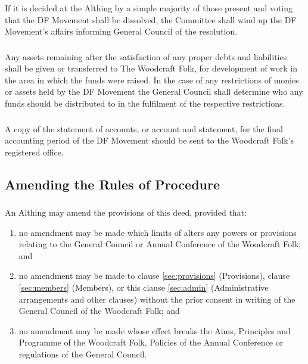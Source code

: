 \documentclass[a4paper, 12pt]{report}
\begin{document}
\subsubsection{}
If it is decided at the Althing by a simple majority of those present and voting that the DF Movement shall be dissolved, the Committee shall wind up the DF Movement's affairs informing General Council of the resolution.
\subsubsection{}
Any assets remaining after the satisfaction of any proper debts and liabilities shall be given or transferred to The Woodcraft Folk, for development of work in the area in which the funds were raised. In the case of any restrictions of monies or assets held by the DF Movement the General Council shall determine who any funds should be distributed to in the fulfilment of the respective restrictions.
\subsubsection{}
A copy of the statement of accounts, or account and statement, for the final accounting period of the DF Movement should be sent to the Woodcraft Folk's registered office.

\subsection{Amending the Rules of Procedure}
\subsubsection{}
An Althing may amend the provisions of this deed, provided that:
\begin{enumerate}[\hspace{0.5cm}(a)]
\item no amendment may be made which limits of alters any powers or provisions relating to the General Council or Annual Conference of the Woodcraft Folk; and
\item no amendment may be made to clause \ref{sec:provisions} (Provisions), clause \ref{sec:members} (Members), or this clause \ref{sec:admin} (Administrative arrangements and other clauses) without the prior consent in writing of the General Council of the Woodcraft Folk; and
\item no amendment may be made whose effect breaks the Aims, Principles and Programme of the Woodcraft Folk, Policies of the Annual Conference or regulations of the General Council.
\end{enumerate}
\end{document}

